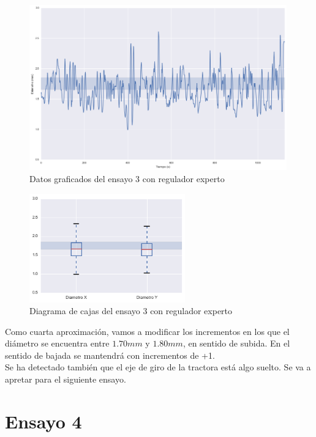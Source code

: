\begin{figure}[H]
    \centering
    \includegraphics[width=0.99\textwidth]{images/producciones/12082015/output_9_e2.png}
    \caption{Datos graficados del ensayo 3 con regulador experto}
    \label{fig:reg_graf3}
\end{figure}

\begin{figure}[H]
    \centering
    \includegraphics[width=0.6\textwidth]{images/producciones/12082015/output_10_e2.png}
    \caption{Diagrama de cajas del ensayo 3 con regulador experto}
    \label{fig:reg_cajas3}
\end{figure}

Como cuarta  aproximación, vamos a  modificar los incrementos en los que el diámetro se encuentra entre $1.70 mm$ y $1.80 mm$, en sentido de subida. En el sentido de bajada se mantendrá con incrementos de +1.\\

Se ha detectado también que el eje de giro de la tractora está algo suelto. Se va a apretar para el siguiente ensayo.

\section{Ensayo 4}
\label{lab:4} 
